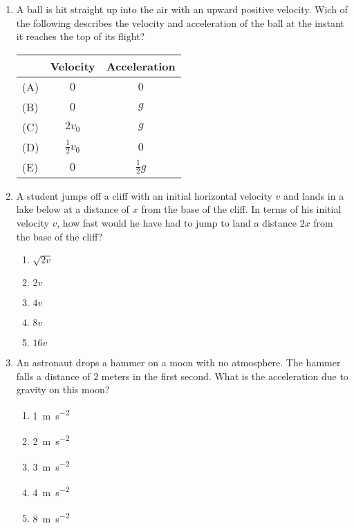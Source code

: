 \documentclass{../../../oss-apphys}
\begin{document}
\begin{multicols}{2}
\begin{enumerate}[resume,leftmargin=18pt]
  \item A ball is hit straight up into the air with an upward positive
    velocity. Wich of the following describes the velocity and acceleration
    of the ball at the instant it reaches the top of its flight?
    \begin{tabular}{lcc}
      & Velocity & Acceleration\\ \hline
      (A) & $0$ & $0$\\
      (B) & $0$ & $g$\\
      (C) & $2v_0$ & $g$\\
      (D) & $\frac{1}{2}v_0$ & $0$\\
      (E) & $0$ & $\frac{1}{2}g$
    \end{tabular}    
    
  \item A student jumps off a cliff with an initial horizontal velocity $v$ and
    lands in a lake below at a distance of $x$ from the base of the cliff. In
    terms of his initial velocity $v$, how fast would he have had to jump to
    land a distance $2x$ from the base of the cliff?
    \begin{center}
    \end{center}
    \begin{enumerate}[noitemsep,topsep=0pt,leftmargin=18pt,label=(\Alph*)]
    \item $\sqrt{2v}$
    \item $2v$
    \item $4v$
    \item $8v$
    \item $16v$
    \end{enumerate}
    
  \item An astronaut drops a hammer on a moon with no atmosphere. The hammer
    falls a distance of $2$ meters in the first second. What is the
    acceleration due to gravity on this moon?
    \begin{enumerate}[noitemsep,topsep=0pt,leftmargin=18pt,label=(\Alph*)]
    \item\SI{1}{\metre\per\second^2}
    \item\SI{2}{\metre\per\second^2}
    \item\SI{3}{\metre\per\second^2}
    \item\SI{4}{\metre\per\second^2}
    \item\SI{8}{\metre\per\second^2}
    \end{enumerate}


\end{enumerate}
\end{multicols}
\end{document}
